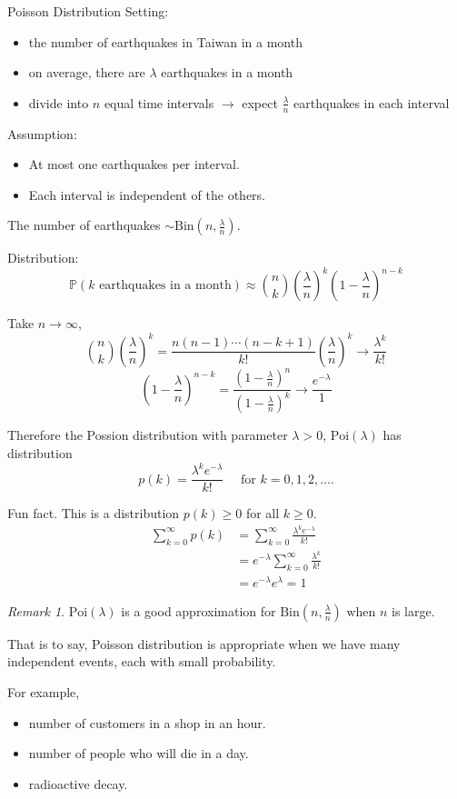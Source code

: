 \documentclass[a4paper,11pt]{amsbook}
\makeatletter
\def\section{\@startsection{section}{2}%
    \z@{1\linespacing\@plus1\linespacing}{.5\linespacing}%
    {\large\normalfont\bfseries\centering\color{darkblue}}}
\theoremstyle{definition}
\theoremstyle{remark}
\newtheorem{remark}{\hspace{-2em} \color{darkblue} Remark}[chapter]
\renewcommand{\P}{\mathbb{P}}
\newcommand\0{\varnothing}
\newcommand\Bin{\text{Bin}}
\newcommand\Poi{\text{Poi}}
\makeatother
\begin{document}
    \section{Poisson Distribution}
    Setting: \begin{itemize}
        \item the number of earthquakes in Taiwan in a month
        \item on average, there are $\lambda$ earthquakes in a month
        \item divide into $n$ equal time intervals $\to$ expect $\frac{\lambda}{n}$ earthquakes in each interval
    \end{itemize}

    Assumption: \begin{itemize}
        \item At most one earthquakes per interval.
        \item Each interval is independent of the others.
    \end{itemize}

    The number of earthquakes $\sim\Bin(n,\tfrac\lambda n)$.

    Distribution: $$\P(k\text{ earthquakes in a month})\approx\binom nk\left(\frac{\lambda}{n}\right)^k\left(1-\frac{\lambda}{n}\right)^{n-k}$$
    
    Take $n\to\infty$,
    $$\binom nk\left(\frac{\lambda}{n}\right)^k=\frac{n(n-1)\cdots(n-k+1)}{k!}\left(\frac{\lambda}{n}\right)^k\to\frac{\lambda^k}{k!}$$
    $$\left(1-\frac{\lambda}{n}\right)^{n-k}=\frac{\left(1-\frac{\lambda}{n}\right)^n}{\left(1-\frac{\lambda}{n}\right)^k}\to\frac{e^{-\lambda}}{1}$$
    
    Therefore the Possion distribution with parameter $\lambda>0$, $\Poi(\lambda)$ has distribution
    $$p(k)=\frac{\lambda^ke^{-\lambda}}{k!}\quad\text{ for }k=0,1,2,\ldots.$$

    Fun fact. This is a distribution $p(k)\geq0$ for all $k\geq0$.
    \begin{align*}
        \sum_{k=0}^\infty p(k)&=\sum_{k=0}^\infty\frac{\lambda^ke^{-\lambda}}{k!} \\
        &=e^{-\lambda}\sum_{k=0}^\infty\frac{\lambda^k}{k!} \\
        &=e^{-\lambda}e^\lambda=1
    \end{align*}
    \begin{remark} 
        $\Poi(\lambda)$ is a good approximation for $\Bin(n,\tfrac{\lambda}{n})$ when $n$ is large.

        That is to say, Poisson distribution is appropriate when we have many independent events, each with small probability.
        
        For example, \begin{itemize}
            \item number of customers in a shop in an hour.
            \item number of people who will die in a day.
            \item radioactive decay.
        \end{itemize}
    \end{remark}
\end{document}

